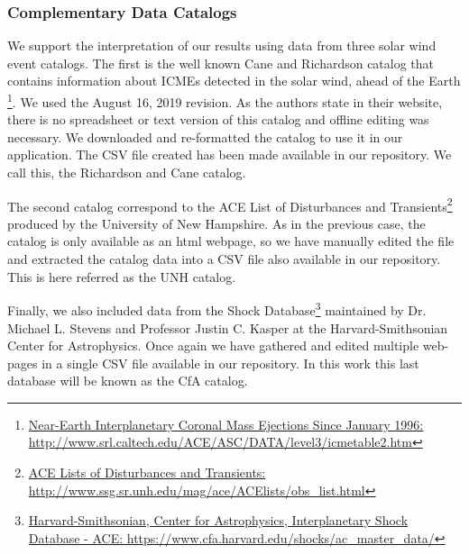 \subsubsection{Complementary Data Catalogs}
We support the interpretation of our results using data from three solar wind event catalogs. The first is the well known Cane and Richardson catalog that contains information about ICMEs detected in the solar wind, ahead of the Earth \citep{Cane2003} \citep{Richardson2010} \footnote{\href{http://www.srl.caltech.edu/ACE/ASC/DATA/level3/icmetable2.htm}{Near-Earth Interplanetary Coronal Mass Ejections Since January 1996: http://www.srl.caltech.edu/ACE/ASC/DATA/level3/icmetable2.htm}}. We used the August 16, 2019 revision. As the authors state in their website, there is no spreadsheet or text version of this catalog and offline editing was necessary. We downloaded and re-formatted the catalog to use it in our application. The CSV file created has been made available in our repository. We call this, the Richardson and Cane catalog. 

The second catalog correspond to the ACE List of Disturbances and Transients\footnote{\href{http://www.ssg.sr.unh.edu/mag/ace/ACElists/obs\_list.html}{ACE Lists of Disturbances and Transients: http://www.ssg.sr.unh.edu/mag/ace/ACElists/obs\_list.html}} produced by the University of New Hampshire. As in the previous case, the catalog is only available as an html webpage, so we have manually edited the file and extracted the catalog data into a CSV file also available in our repository. This is here referred as the UNH catalog.


Finally, we also included data from the Shock Database\footnote{\href{https://www.cfa.harvard.edu/shocks/ac_master_data/}{Harvard-Smithsonian, Center for Astrophysics, Interplanetary Shock Database - ACE: https://www.cfa.harvard.edu/shocks/ac\_master\_data/}} maintained by Dr. Michael L. Stevens and Professor Justin C. Kasper at the Harvard-Smithsonian Center for Astrophysics. Once again we have gathered and edited multiple web-pages in a single CSV file available in our repository. In this work this last database will be known as the CfA catalog.